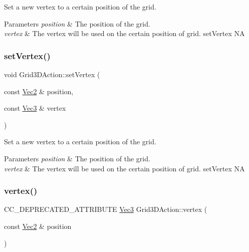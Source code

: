 Set a new vertex to a certain position of the grid. 


\begin{DoxyParams}{Parameters}
{\em position} & The position of the grid. \\
\hline
{\em vertex} & The vertex will be used on the certain position of grid.  set\+Vertex  NA \\
\hline
\end{DoxyParams}
\mbox{\label{classGrid3DAction_a110cf4db66e0410d971d9f47e116fdbf}} 
\subsubsection{\texorpdfstring{set\+Vertex()}{setVertex()}\hspace{0.1cm}{\footnotesize\ttfamily [2/2]}}
{\footnotesize\ttfamily void Grid3\+D\+Action\+::set\+Vertex (\begin{DoxyParamCaption}\item[{const \hyperlink{classVec2}{Vec2} \&}]{position,  }\item[{const \hyperlink{classVec3}{Vec3} \&}]{vertex }\end{DoxyParamCaption})}



Set a new vertex to a certain position of the grid. 


\begin{DoxyParams}{Parameters}
{\em position} & The position of the grid. \\
\hline
{\em vertex} & The vertex will be used on the certain position of grid.  set\+Vertex  NA \\
\hline
\end{DoxyParams}
\mbox{\label{classGrid3DAction_a75b5c44d0729a43476dff9ab6e7b281c}} 
\subsubsection{\texorpdfstring{vertex()}{vertex()}\hspace{0.1cm}{\footnotesize\ttfamily [1/2]}}
{\footnotesize\ttfamily C\+C\+\_\+\+D\+E\+P\+R\+E\+C\+A\+T\+E\+D\+\_\+\+A\+T\+T\+R\+I\+B\+U\+TE \hyperlink{classVec3}{Vec3} Grid3\+D\+Action\+::vertex (\begin{DoxyParamCaption}\item[{const \hyperlink{classVec2}{Vec2} \&}]{position }\end{DoxyParamCaption})\hspace{0.3cm}{\ttfamily [inline]}}


